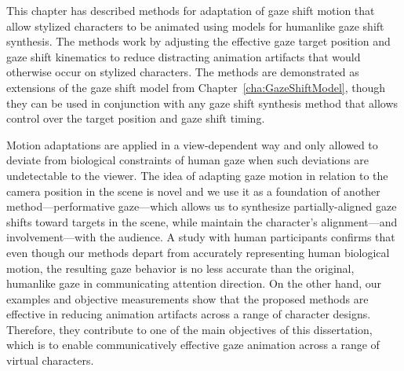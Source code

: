 This chapter has described methods for adaptation of gaze shift motion that allow stylized characters to be animated using models for humanlike gaze shift synthesis. The methods work by adjusting the effective gaze target position and gaze shift kinematics to reduce distracting animation artifacts that would otherwise occur on stylized characters. The methods are demonstrated as extensions of the gaze shift model from Chapter~\ref{cha:GazeShiftModel}, though they can be used in conjunction with any gaze shift synthesis method that allows control over the target position and gaze shift timing.

Motion adaptations are applied in a view-dependent way and only allowed to deviate from biological constraints of human gaze when such deviations are undetectable to the viewer. The idea of adapting gaze motion in relation to the camera position in the scene is novel and we use it as a foundation of another method---performative gaze---which allows us to synthesize partially-aligned gaze shifts toward targets in the scene, while maintain the character's alignment---and involvement---with the audience. A study with human participants confirms that even though our methods depart from accurately representing human biological motion, the resulting gaze behavior is no less accurate than the original, humanlike gaze in communicating attention direction. On the other hand, our examples and objective measurements show that the proposed methods are effective in reducing animation artifacts across a range of character designs. Therefore, they contribute to one of the main objectives of this dissertation, which is to enable communicatively effective gaze animation across a range of virtual characters.